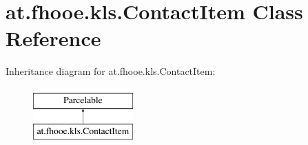 \hypertarget{classat_1_1fhooe_1_1kls_1_1_contact_item}{\section{at.\-fhooe.\-kls.\-Contact\-Item Class Reference}
\label{classat_1_1fhooe_1_1kls_1_1_contact_item}
}
Inheritance diagram for at.\-fhooe.\-kls.\-Contact\-Item\-:\begin{figure}[H]
\begin{center}
\leavevmode
\includegraphics[height=2.000000cm]{classat_1_1fhooe_1_1kls_1_1_contact_item}
\end{center}
\end{figure}
